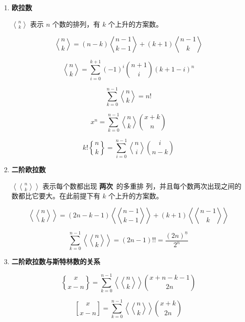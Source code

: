 \documentclass[a4paper, twoside]{article}
\begin{document}
            \begin{enumerate}
            
            \item \textbf{欧拉数}
            
            ${n\bangle k}$ 表示 $n$ 个数的排列，有 $k$ 个上升的方案数。
            
            $$ {n\bangle k} = (n - k){n - 1 \bangle k - 1} + (k + 1){n - 1 \bangle k} $$
            
            $$ {n\bangle k} = \sum_{i = 0} ^ {k + 1} (-1)^i {n + 1\choose i} (k + 1 - i)^n $$
            
            $$ \sum_{k = 0} ^ {n - 1} {n\bangle k} = n! $$
            
            $$ x^n = \sum_{k = 0} ^ {n - 1} {n\bangle k} {x+k \choose n} $$
            
            $$ k!{n\brace k} = \sum_{i = 0} ^ {n - 1} {n\bangle i} {i\choose n - k} $$
            
            \item \textbf{二阶欧拉数}
            
            $\left\langle\!\!{n\bangle k}\!\!\right\rangle$ 表示每个数都出现 \textbf{两次}\ 的多重排        列，并且每个数两次出现之间的数都比它要大。在此前提下有 $k$ 个上升的方案数。
            
            $$ \left\langle\!\!{n\bangle k}\!\!\right\rangle = (2n-k-1)\left\langle\!\!{n-1\bangle      k-1}\!\!\right\rangle + (k+1)\left\langle\!\!{n-1 \bangle k}\!\!\right\rangle $$
            
            $$ \sum_{k = 0} ^ {n - 1} \left\langle\!\!{n\bangle k}\!\!\right\rangle = (2n-1)!! =        \frac{(2n)^{\underline n}} {2^n} $$
            
            \item \textbf{二阶欧拉数与斯特林数的关系}
            
            $$ {x \brace x-n} = \sum_{k = 0} ^ {n - 1} \left\langle\!\!{n\bangle k}\!\!\right\rangle        {x + n - k - 1 \choose 2n} $$
            
            $$ {x \brack x-n} = \sum_{k = 0} ^ {n - 1} \left\langle\!\!{n\bangle k}\!\!\right\rangle        {x + k \choose 2n} $$
            
            \end{enumerate}
\end{document}
